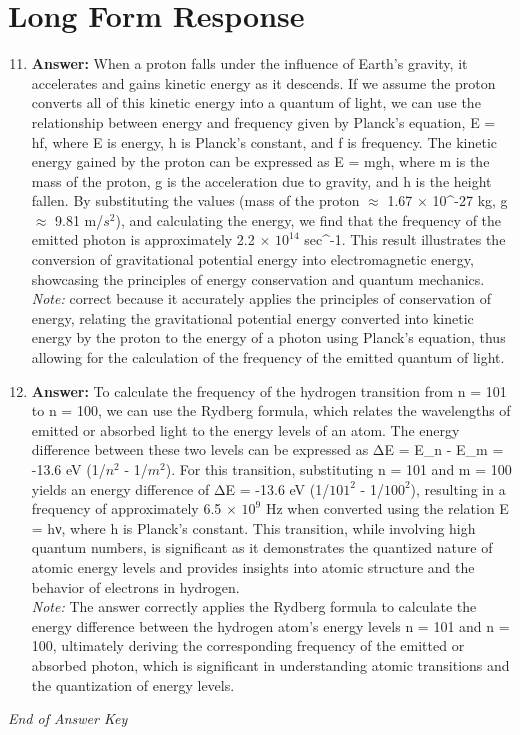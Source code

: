 \documentclass[12pt]{article}
\begin{document}
\section*{Long Form Response}
\begin{enumerate}[label=\arabic*.]
\setcounter{enumi}{10}
\item \textbf{Answer:} When a proton falls under the influence of Earth's gravity, it accelerates and gains kinetic energy as it descends. If we assume the proton converts all of this kinetic energy into a quantum of light, we can use the relationship between energy and frequency given by Planck's equation, E = hf, where E is energy, h is Planck's constant, and f is frequency. The kinetic energy gained by the proton can be expressed as E = mgh, where m is the mass of the proton, g is the acceleration due to gravity, and h is the height fallen. By substituting the values (mass of the proton \ensuremath{\approx} 1.67 \ensuremath{\times} 10^-27 kg, g \ensuremath{\approx} 9.81 m/$s^2$), and calculating the energy, we find that the frequency of the emitted photon is approximately 2.2 \ensuremath{\times} $10^14$ sec^-1. This result illustrates the conversion of gravitational potential energy into electromagnetic energy, showcasing the principles of energy conservation and quantum mechanics.
\\ \textit{Note:} correct because it accurately applies the principles of conservation of energy, relating the gravitational potential energy converted into kinetic energy by the proton to the energy of a photon using Planck's equation, thus allowing for the calculation of the frequency of the emitted quantum of light.
\item \textbf{Answer:} To calculate the frequency of the hydrogen transition from n = 101 to n = 100, we can use the Rydberg formula, which relates the wavelengths of emitted or absorbed light to the energy levels of an atom. The energy difference between these two levels can be expressed as ΔE = E\_n - E\_m = -13.6 eV (1/$n^2$ - 1/$m^2$). For this transition, substituting n = 101 and m = 100 yields an energy difference of ΔE = -13.6 eV (1/$101^2$ - 1/$100^2$), resulting in a frequency of approximately 6.5 \ensuremath{\times} $10^9$ Hz when converted using the relation E = hν, where h is Planck's constant. This transition, while involving high quantum numbers, is significant as it demonstrates the quantized nature of atomic energy levels and provides insights into atomic structure and the behavior of electrons in hydrogen.
\\ \textit{Note:} The answer correctly applies the Rydberg formula to calculate the energy difference between the hydrogen atom's energy levels n = 101 and n = 100, ultimately deriving the corresponding frequency of the emitted or absorbed photon, which is significant in understanding atomic transitions and the quantization of energy levels.
\end{enumerate}

\vfill
\noindent\textit{End of Answer Key}
\end{document}
